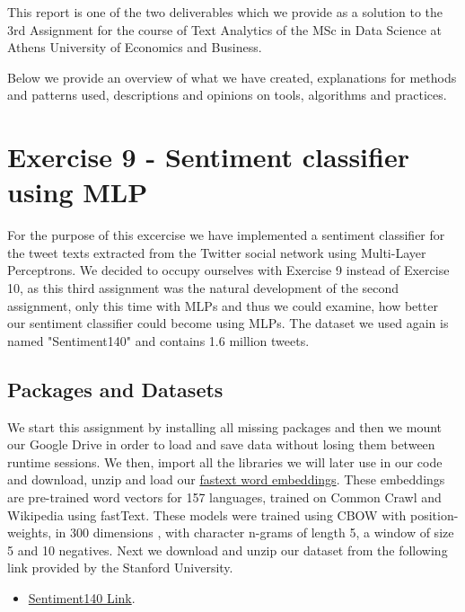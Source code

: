 \documentclass[10pt]{article}
\begin{document}
\maketitle

This report is one of the two deliverables which we provide as a solution to the 3rd Assignment for the course of Text Analytics of the MSc in Data Science at Athens University of Economics and Business. 

Below we provide an overview of what we have created, explanations for methods and patterns used, descriptions and opinions on tools, algorithms and practices.

\section*{Exercise 9 - Sentiment classifier using MLP}

For the purpose of this excercise we have implemented a sentiment classifier for the tweet texts extracted from the Twitter social network using Multi-Layer Perceptrons. We decided to occupy ourselves with Exercise 9 instead of Exercise 10, as this third assignment was the natural development of the second assignment, only this time with MLPs and thus we could examine, how better our sentiment classifier could become using MLPs. The dataset we used again is named "Sentiment140" and contains 1.6 million tweets.

\subsection*{Packages and Datasets}
We start this assignment by installing all missing packages and then we mount our Google Drive in order to load and save data without losing them between runtime sessions. We then, import all the libraries we will later use in our code and download, unzip and load our \href{https://fasttext.cc/docs/en/crawl-vectors.html}{fastext word embeddings}. These embeddings are pre-trained word vectors for 157 languages, trained on Common Crawl and Wikipedia using fastText. These models were trained using CBOW with position-weights, in 300 dimensions , with character n-grams of length 5, a window of size 5 and 10 negatives. Next we download and unzip our dataset from the following link provided by the Stanford University.

\begin{itemize}
\item
\href{http://cs.stanford.edu/people/alecmgo/trainingandtestdata.zip}{Sentiment140 Link}.
\end{itemize}
\end{document}
